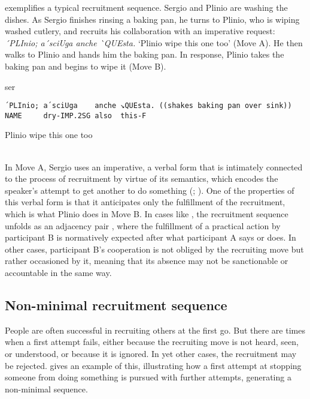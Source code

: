 \documentclass[output=paper,modfonts]{langscibook}
\begin{document}
 exemplifies a typical recruitment sequence. Sergio and Plinio are washing the dishes. As Sergio finishes rinsing a baking pan, he turns to Plinio, who is wiping washed cutlery, and recruits his collaboration with an imperative request: \textit{´{}PLInio; a´{}sciUga anche \`{}QUEsta.} ‘Plinio wipe this one too’ (Move A). He then walks to Plinio and hands him the baking pan. In response, Plinio takes the baking pan and begins to wipe it (Move B).

\vspace{2mm}
%
%
\begin{mdframednoverticalspace}[style=firstfoc]
\begin{transbox}{2}{ser}
\begin{verbatim}
´PLInio; a´sciUga    anche ↘QUEsta. ((shakes baking pan over sink))
NAME     dry-IMP.2SG also  this-F
\end{verbatim}
Plinio wipe this one too
\end{transbox}
\end{mdframednoverticalspace}\vspace{1mm}
%
%
\begin{mdframednoverticalspace}[style=secondfoc]
\end{mdframednoverticalspace}\vspace{-1mm}
%
\\

In Move A, Sergio uses an imperative, a verbal form that is intimately connected to the process of recruitment by virtue of its semantics, which encodes the speaker's attempt to get another to do something (\citealt[746--748]{Lyons1977}; \citealt[170--171]{SadockZwicky1985}). One of the properties of this verbal form is that it anticipates only the fulfillment of the recruitment, which is what Plinio does in Move B. In cases like , the recruitment sequence unfolds as an adjacency pair \citep{Schegloff1968,SchegloffSacks1973}, where the fulfillment of a practical action by participant B is normatively expected after what participant A says or does. In other cases, participant B's cooperation is not obliged by the recruiting move but rather occasioned by it, meaning that its absence may not be sanctionable or accountable in the same way. 

\subsection{Non-minimal recruitment sequence}\label{sec:rossi:2.2}
People are often successful in recruiting others at the first go. But there are times when a first attempt fails, either because the recruiting move is not heard, seen, or understood, or because it is ignored. In yet other cases, the recruitment may be rejected.  gives an example of this, illustrating how a first attempt at stopping someone from doing something is pursued with further attempts, generating a non-minimal sequence.
\end{document}
